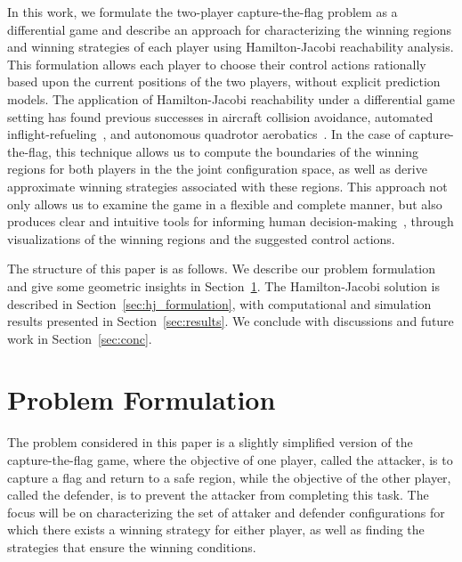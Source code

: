 \documentclass[letterpaper, 10 pt, conference]{ieeeconf}  %
\numberwithin{algorithm}{section}
\begin{document}
In this work, we formulate the two-player capture-the-flag problem as a differential game and describe an approach for characterizing the winning regions and winning strategies of each player using Hamilton-Jacobi reachability analysis.  This formulation allows each player to choose their control actions rationally based upon the current positions of the two players, without explicit prediction models.  The application of Hamilton-Jacobi reachability under a differential game setting has found previous successes in aircraft collision avoidance\cite{j:mitchell-TAC-2005}, automated inflight-refueling~\cite{DSST08}, and autonomous quadrotor aerobatics~\cite{GHVT09b}.  In the case of capture-the-flag, this technique allows us to compute the boundaries of the winning regions for both players in the the joint configuration space, as well as derive approximate winning strategies associated with these regions.  This approach not only allows us to examine the game in a flexible and complete manner, but also produces clear and intuitive tools for informing human decision-making~\cite{Oishi:2008p98}, through visualizations of the winning regions and the suggested control actions.  

The structure of this paper is as follows.  We describe our problem formulation and give some geometric insights in Section~\ref{sec:formulation}.  The Hamilton-Jacobi solution is described in Section~\ref{sec:hj_formulation}, with computational and simulation results presented in Section~\ref{sec:results}.  We conclude with discussions and future work in Section~\ref{sec:conc}.  

\section{Problem Formulation}
\label{sec:formulation}
The problem considered in this paper is a slightly simplified version of the capture-the-flag game, where the objective of one player, called the attacker, is to capture a flag and return to a safe region, while the objective of the other player, called the defender, is to prevent the attacker from completing this task.  The focus will be on characterizing the set of attaker and defender configurations for which there exists a winning strategy for either player, as well as finding the strategies that ensure the winning conditions.  
\end{document}
